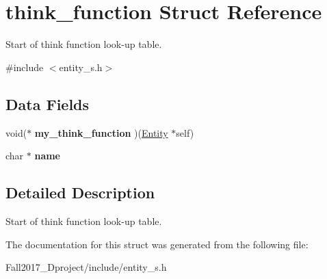 \hypertarget{structthink__function}{}\section{think\+\_\+function Struct Reference}
\label{structthink__function}


Start of think function look-\/up table.  




{\ttfamily \#include $<$entity\+\_\+s.\+h$>$}

\subsection*{Data Fields}
\begin{DoxyCompactItemize}
\item 
\mbox{\label{structthink__function_a7bbc48756692dbd8c333f59227442834}} 
void($\ast$ {\bfseries my\+\_\+think\+\_\+function} )(\hyperlink{structentity__s}{Entity} $\ast$self)
\item 
\mbox{\label{structthink__function_a5ac083a645d964373f022d03df4849c8}} 
char $\ast$ {\bfseries name}
\end{DoxyCompactItemize}


\subsection{Detailed Description}
Start of think function look-\/up table. 

The documentation for this struct was generated from the following file\+:\begin{DoxyCompactItemize}
\item 
Fall2017\+\_\+Dproject/include/entity\+\_\+s.\+h\end{DoxyCompactItemize}
